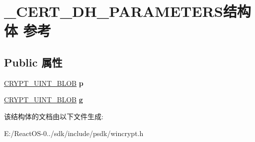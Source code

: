 \hypertarget{struct___c_e_r_t___d_h___p_a_r_a_m_e_t_e_r_s}{}\section{\+\_\+\+C\+E\+R\+T\+\_\+\+D\+H\+\_\+\+P\+A\+R\+A\+M\+E\+T\+E\+R\+S结构体 参考}
\label{struct___c_e_r_t___d_h___p_a_r_a_m_e_t_e_r_s}
\subsection*{Public 属性}
\begin{DoxyCompactItemize}
\item 
\mbox{\label{struct___c_e_r_t___d_h___p_a_r_a_m_e_t_e_r_s_a573347e1742879df9212d7c2e9fbaeeb}} 
\hyperlink{struct___c_r_y_p_t_o_a_p_i___b_l_o_b}{C\+R\+Y\+P\+T\+\_\+\+U\+I\+N\+T\+\_\+\+B\+L\+OB} {\bfseries p}
\item 
\mbox{\label{struct___c_e_r_t___d_h___p_a_r_a_m_e_t_e_r_s_a702b0368b8955304555942e5940b964d}} 
\hyperlink{struct___c_r_y_p_t_o_a_p_i___b_l_o_b}{C\+R\+Y\+P\+T\+\_\+\+U\+I\+N\+T\+\_\+\+B\+L\+OB} {\bfseries g}
\end{DoxyCompactItemize}


该结构体的文档由以下文件生成\+:\begin{DoxyCompactItemize}
\item 
E\+:/\+React\+O\+S-\/0../sdk/include/psdk/wincrypt.\+h\end{DoxyCompactItemize}
